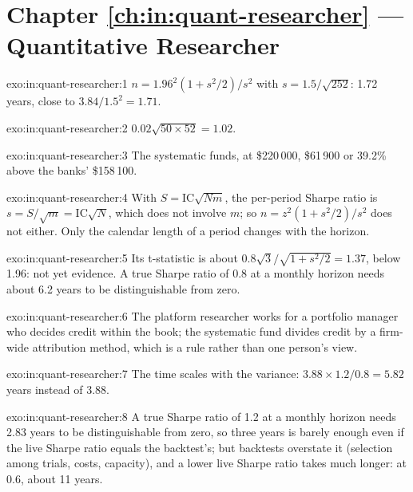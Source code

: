 \section*{Chapter \ref{ch:in:quant-researcher} --- Quantitative Researcher}

\begin{solution}{exo:in:quant-researcher:1}
$n=1.96^2(1+s^2/2)/s^2$ with $s=1.5/\sqrt{252}$: 1.72 years, close to $3.84/1.5^2=1.71$.
\end{solution}

\begin{solution}{exo:in:quant-researcher:2}
$0.02\sqrt{50\times52}=1.02$.
\end{solution}

\begin{solution}{exo:in:quant-researcher:3}
The systematic funds, at \$220\,000, \$61\,900 or 39.2\% above the banks' \$158\,100.
\end{solution}

\begin{solution}{exo:in:quant-researcher:4}
With $S=\mathrm{IC}\sqrt{Nm}$, the per-period Sharpe ratio is $s=S/\sqrt m=\mathrm{IC}\sqrt N$, which does not involve $m$;
so $n=z^2(1+s^2/2)/s^2$ does not either. Only the calendar length of a period changes with the horizon.
\end{solution}

\begin{solution}{exo:in:quant-researcher:5}
Its t-statistic is about $0.8\sqrt3/\sqrt{1+s^2/2}=1.37$, below 1.96: not yet evidence. A true Sharpe ratio of 0.8 at a
monthly horizon needs about 6.2 years to be distinguishable from zero.
\end{solution}

\begin{solution}{exo:in:quant-researcher:6}
The platform researcher works for a portfolio manager who decides credit within the book; the systematic fund divides
credit by a firm-wide attribution method, which is a rule rather than one person's view.
\end{solution}

\begin{solution}{exo:in:quant-researcher:7}
The time scales with the variance: $3.88\times1.2/0.8=5.82$ years instead of 3.88.
\end{solution}

\begin{solution}{exo:in:quant-researcher:8}
A true Sharpe ratio of 1.2 at a monthly horizon needs 2.83 years to be distinguishable from zero, so three years is barely
enough even if the live Sharpe ratio equals the backtest's; but backtests overstate it (selection among trials, costs,
capacity), and a lower live Sharpe ratio takes much longer: at 0.6, about 11 years.
\end{solution}

